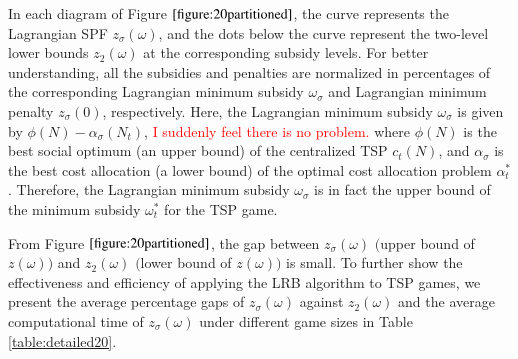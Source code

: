 \documentclass[authoryear,review,12pt]{elsarticle}
\begin{document}
In each diagram of Figure $\ref{figure:20partitioned}$, the curve represents the Lagrangian SPF $z_{\sigma}(\omega)$, and the dots below the curve represent the two-level lower bounds $z_{2}(\omega)$ at the corresponding subsidy levels.
For better understanding, all the subsidies and penalties are normalized in percentages of the corresponding Lagrangian minimum subsidy $\omega_{\sigma}$ and Lagrangian minimum penalty $z_{\sigma}(0)$, respectively.
Here, the Lagrangian minimum subsidy $\omega_{\sigma}$ is given by $\phi(N) - \alpha_{\sigma}(N_t)$, \textcolor{red}{I suddenly feel there is no problem.} where $\phi(N)$ is the best social optimum (an upper bound) of the centralized TSP $c_t(N)$, and $\alpha_{\sigma}$ is the best cost allocation (a lower bound) of the optimal cost allocation problem $\alpha_t^*$.
Therefore, the Lagrangian minimum subsidy $\omega_{\sigma}$ is in fact the upper bound of the minimum subsidy $\omega_t^*$ for the TSP game.


From Figure $\ref{figure:20partitioned}$, the gap between $z_{\sigma}(\omega)$ $\big($upper bound of $z(\omega)$$\big)$ and $z_2(\omega)$ $\big($lower bound of $z(\omega)$$\big)$ is small.
To further show the effectiveness and efficiency of applying the LRB algorithm to TSP games, we present the average percentage gaps of $z_{\sigma}(\omega)$ against $z_2(\omega)$ and the average computational time of $z_{\sigma}(\omega)$ under different game sizes in Table \ref{table:detailed20}.
\end{document}

